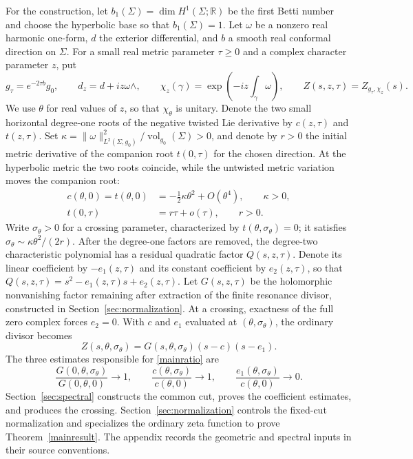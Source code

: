 \documentclass[11pt,letterpaper,reqno]{amsart}
\theoremstyle{remark}
\begin{document}
For the construction, let $b_1(\Sigma)=\dim H^1(\Sigma;\mathbb R)$
be the first Betti number and choose the hyperbolic base so that
$b_1(\Sigma)=1$. Let $\omega$ be a nonzero real harmonic one-form,
$d$ the exterior differential, and $b$ a smooth real conformal
direction on $\Sigma$. For a small real metric parameter $\tau\geq0$
and a complex character parameter $z$, put
\[
 g_\tau=e^{-2\tau b}g_0,\qquad d_z=d+iz\omega\wedge,\qquad
 \chi_z(\gamma)=\exp\left(-iz\int_\gamma\omega\right),\qquad
 Z(s,z,\tau)=Z_{g_\tau,\chi_z}(s).
\]
We use $\theta$ for real values of $z$, so that $\chi_\theta$ is
unitary. Denote the two small horizontal degree-one roots of the
negative twisted Lie derivative by $c(z,\tau)$ and $t(z,\tau)$.
Set $\kappa=\|\omega\|_{L^2(\Sigma,g_0)}^2/
\operatorname{vol}_{g_0}(\Sigma)>0$, and denote by $r>0$ the initial
metric derivative of the companion root $t(0,\tau)$ for the chosen
direction. At the hyperbolic metric the two roots coincide, while the
untwisted metric variation moves the companion root:
\begin{equation}\label{mechanism}
 \begin{aligned}
 c(\theta,0)=t(\theta,0)
   &=-\tfrac12\kappa\theta^2+O(\theta^4),\qquad \kappa>0,\\
 t(0,\tau)&=r\tau+o(\tau),\qquad r>0.
 \end{aligned}
\end{equation}
Write $\sigma_\theta>0$ for a crossing parameter, characterized by
$t(\theta,\sigma_\theta)=0$; it satisfies
$\sigma_\theta\sim\kappa\theta^2/(2r)$. After the degree-one factors
are removed, the degree-two characteristic polynomial has a residual
quadratic factor $Q(s,z,\tau)$. Denote its linear coefficient by
$-e_1(z,\tau)$ and its constant coefficient by $e_2(z,\tau)$, so that
$Q(s,z,\tau)=s^2-e_1(z,\tau)s+e_2(z,\tau)$. Let $G(s,z,\tau)$ be the
holomorphic nonvanishing factor remaining after extraction of the
finite resonance divisor, constructed in Section~\ref{sec:normalization}.
At a crossing, exactness of the full zero complex forces $e_2=0$.
With $c$ and $e_1$ evaluated at $(\theta,\sigma_\theta)$, the ordinary
divisor becomes
\[
 Z(s,\theta,\sigma_\theta)
   =G(s,\theta,\sigma_\theta)(s-c)(s-e_1).
\]
The three estimates responsible for \eqref{mainratio} are
\begin{equation}\label{threeestimates}
 \frac{G(0,\theta,\sigma_\theta)}{G(0,\theta,0)}\longrightarrow1,
 \qquad
 \frac{c(\theta,\sigma_\theta)}{c(\theta,0)}\longrightarrow1,
 \qquad
 \frac{e_1(\theta,\sigma_\theta)}{c(\theta,0)}\longrightarrow0.
\end{equation}
Section~\ref{sec:spectral} constructs the common cut, proves the
coefficient estimates, and produces the crossing.
Section~\ref{sec:normalization} controls the fixed-cut normalization
and specializes the ordinary zeta function to prove
Theorem~\ref{mainresult}. The appendix records the geometric and
spectral inputs in their source conventions.
\end{document}
